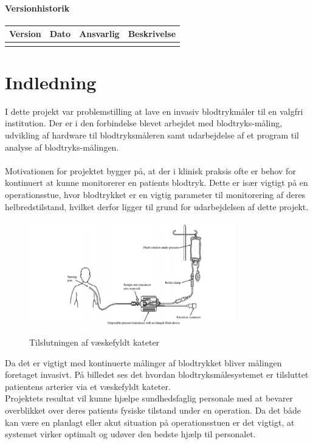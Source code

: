 \subsubsection{Versionhistorik}

\begin{longtabu} to 
    Version &    Dato &    Ansvarlig &    Beskrivelse\\[-1ex]
    \midrule
   
    	
\label{version_Systemark}
\end{longtabu}

\chapter{Indledning}
I dette projekt var problemstilling at lave en invasiv blodtrykmåler til en valgfri institution. Der er i den forbindelse blevet arbejdet med blodtryks-måling, udvikling af hardware til blodtryksmåleren samt udarbejdelse af et program til analyse af blodtryks-målingen.\\ 
\\
Motivationen for projektet bygger på, at der i klinisk praksis ofte er behov for kontinuert at kunne monitorerer en patients blodtryk. Dette er især vigtigt på en operationsstue, hvor blodtrykket er en vigtig parameter til monitorering af deres helbredstilstand, hvilket derfor ligger til grund for udarbejdelsen af dette projekt.\\
\begin{figure}[H]
	\centering
	\includegraphics[width=0.8\textwidth]{Figurer/Indledning/Opstilling}
	\label{Opstilling}
	\caption{Tilslutningen af væskefyldt kateter}
\end{figure}
Da det er vigtigt med kontinuerte målinger af blodtrykket bliver målingen foretaget invasivt. På billedet ses det hvordan blodtryksmålesystemet er tilsluttet patientens arterier via et væskefyldt kateter.\\
Projektets resultat vil kunne hjælpe sundhedsfaglig personale med at bevarer overblikket over deres patients fysiske tilstand under en operation. Da det både kan være en planlagt eller akut situation på operationsstuen er det vigtigt, at systemet virker optimalt og udøver den bedste hjælp til personalet.\\
